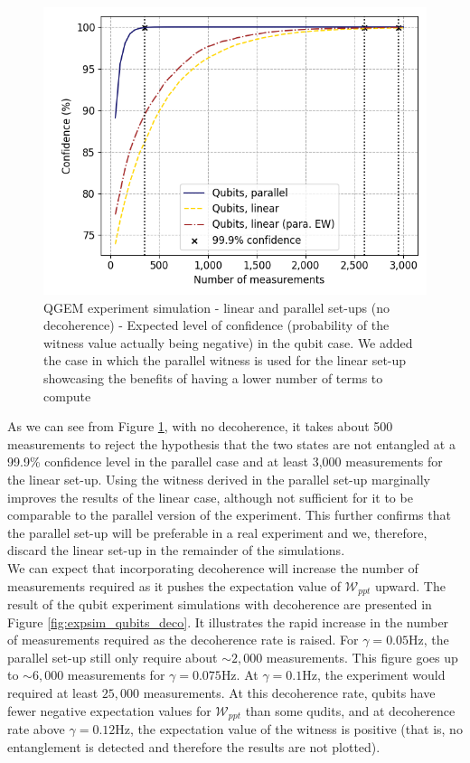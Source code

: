 \documentclass[%
 reprint,
 superscriptaddress,
 amsmath,
 amssymb,
 aps,
 longbibliography
]{revtex4-2}
\begin{document}
	\begin{figure}
		\includegraphics[width=1.\columnwidth]{EW_confidence_v18.png}\par\medskip
	    \caption{QGEM experiment simulation - linear and parallel set-ups (no decoherence) - Expected level of confidence (probability of the witness value actually being negative) in the qubit case. We added the case in which the parallel witness is used for the linear set-up showcasing the benefits of having a lower number of terms to compute}\label{fig:expsimqubits}
	\end{figure}
\indent As we can see from Figure \ref{fig:expsimqubits}, with no decoherence, it takes about 500 measurements to reject the hypothesis that the two states are not entangled at a 99.9\% confidence level in the parallel case and at least 3,000 measurements for the linear set-up.  Using the witness derived in the parallel set-up marginally improves the results of the linear case, although not sufficient for it to be comparable to the parallel version of the experiment. This further confirms that the parallel set-up will be preferable in a real experiment and we, therefore, discard the linear set-up in the remainder of the simulations. \\
\indent We can expect that incorporating decoherence will increase the number of measurements required as it pushes the expectation value of $\mathcal{W}_{ppt}$ upward. The result of the qubit experiment simulations with decoherence are presented in Figure \ref{fig:expsim_qubits_deco}. It illustrates the rapid increase in the number of measurements required as the decoherence rate is raised. For $\gamma=0.05$Hz, the parallel set-up still only require about $\sim 2,000$ measurements. This figure goes up to $\sim 6,000$ measurements for $\gamma = 0.075$Hz. At $\gamma=0.1$Hz, the experiment would required at least $25,000$ measurements. At this decoherence rate, qubits have fewer negative expectation values for $\mathcal{W}_{ppt}$ than some qudits, and at decoherence rate above $\gamma = 0.12$Hz, the expectation value of the witness is positive (that is, no entanglement is detected and therefore the results are not plotted). \\
\end{document}
